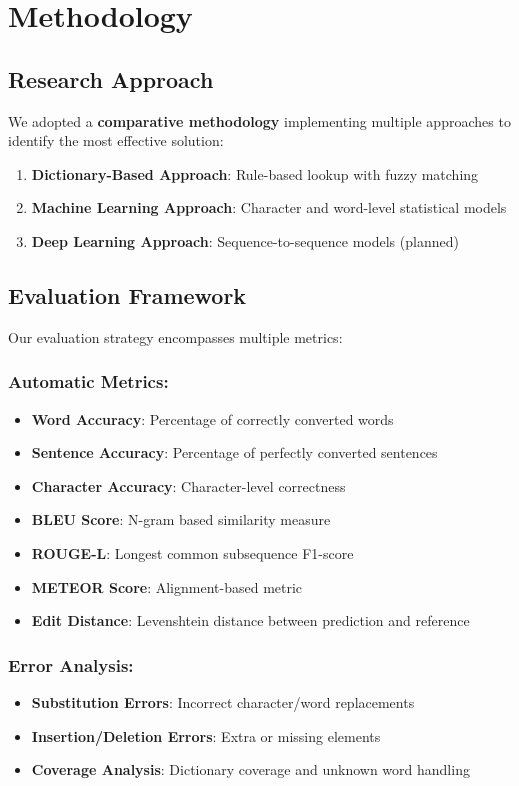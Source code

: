 \documentclass[10pt,twocolumn]{article}
\begin{document}
\section{Methodology}

\subsection{Research Approach}
We adopted a \textbf{comparative methodology} implementing multiple approaches to identify the most effective solution:
\begin{enumerate}[label=\arabic*.]
    \item \textbf{Dictionary-Based Approach}: Rule-based lookup with fuzzy matching
    \item \textbf{Machine Learning Approach}: Character and word-level statistical models
    \item \textbf{Deep Learning Approach}: Sequence-to-sequence models (planned)
\end{enumerate}

\subsection{Evaluation Framework}
Our evaluation strategy encompasses multiple metrics:

\subsubsection*{Automatic Metrics:}
\begin{itemize}[leftmargin=*,noitemsep,topsep=0pt,parsep=0pt,partopsep=0pt]
    \item \textbf{Word Accuracy}: Percentage of correctly converted words
    \item \textbf{Sentence Accuracy}: Percentage of perfectly converted sentences
    \item \textbf{Character Accuracy}: Character-level correctness
    \item \textbf{BLEU Score}: N-gram based similarity measure
    \item \textbf{ROUGE-L}: Longest common subsequence F1-score
    \item \textbf{METEOR Score}: Alignment-based metric
    \item \textbf{Edit Distance}: Levenshtein distance between prediction and reference
\end{itemize}

\subsubsection*{Error Analysis:}
\begin{itemize}[leftmargin=*,noitemsep,topsep=0pt,parsep=0pt,partopsep=0pt]
    \item \textbf{Substitution Errors}: Incorrect character/word replacements
    \item \textbf{Insertion/Deletion Errors}: Extra or missing elements
    \item \textbf{Coverage Analysis}: Dictionary coverage and unknown word handling
\end{itemize}
\end{document}
